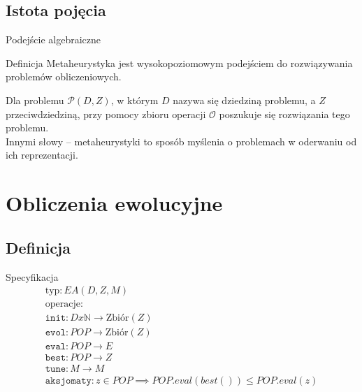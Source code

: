 \documentclass[slidescentered]{beamer}
\begin{document}
\subsection{Istota pojęcia}
\begin{frame}{Podejście algebraiczne}
	\pause
	\begin{block}{Definicja}
		Metaheurystyka jest wysokopoziomowym podejściem do rozwiązywania problemów obliczeniowych. 
	\end{block}
	
	\pause Dla problemu $\mathcal{P}(D, Z)$, w którym $D$ nazywa się dziedziną problemu, a $Z$ przeciwdziedziną, przy pomocy zbioru operacji $\mathcal{O}$ poszukuje się rozwiązania tego problemu. \\
	\centering
	\pause Innymi słowy -- metaheurystyki to sposób myślenia o problemach w oderwaniu od ich reprezentacji.
\end{frame}


\section{Obliczenia ewolucyjne}
\subsection{Definicja}

\begin{frame}{Specyfikacja}
	\begin{multline}
		\text{typ}: EA(D, Z, M) \\
		\text{operacje}: \\
		\texttt{init}:  D x \mathbb{N} \rightarrow \text{Zbiór}(Z) \\
		\texttt{evol}: POP \rightarrow \text{Zbiór}(Z) \\
		\texttt{eval}: POP \rightarrow E \\
		\texttt{best}: POP \rightarrow Z \\
		\texttt{tune}: M \rightarrow M \\
		\texttt{aksjomaty}: z \in POP \implies  POP.eval(best()) \leq POP.eval(z) \\
	\end{multline}
\end{frame}
\end{document}
